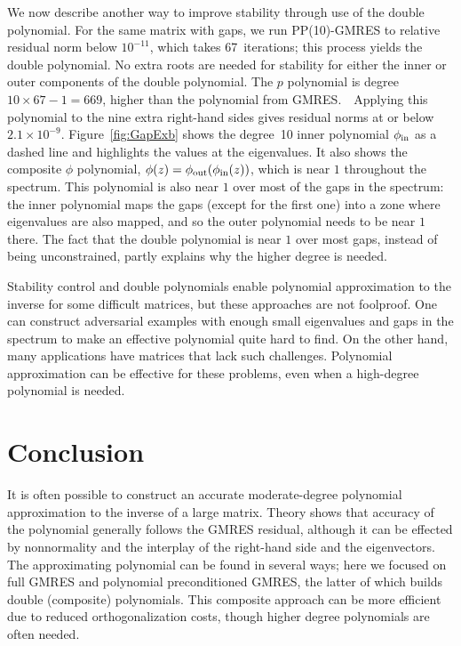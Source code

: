 \documentclass{siamart}
\begin{document}
We now describe another way to improve stability through use of the double polynomial.  For the same matrix with gaps, we run PP(10)-GMRES to relative residual norm below $10^{-11}$, which takes 67~iterations; this process yields the double polynomial.  No extra roots are needed for stability for either the inner or outer components of the double polynomial.  The $p$ polynomial is degree $10\times 67-1 = 669$, higher than the polynomial from GMRES.\ \   Applying this polynomial to the nine extra right-hand sides gives residual norms at or below $2.1\times 10^{-9}$.  Figure~\ref{fig:GapExb} shows the degree~10 inner polynomial $\phi_{\rm in}$ as a dashed line and highlights the values at the eigenvalues.  It also shows the composite $\phi$ polynomial, $\phi(z) = \phi_{\rm out}(\phi_{\rm in}(z))$, which is near $1$ throughout the spectrum.  This polynomial is also near $1$ over most of the gaps in the spectrum: the inner polynomial maps the gaps (except for the first one) into a zone where eigenvalues are also mapped, and so the outer polynomial needs to be near $1$ there.  The fact that the double polynomial is near $1$ over most gaps, instead of being unconstrained, partly explains why the higher degree is needed. 

Stability control and double polynomials enable polynomial approximation to the inverse for some difficult matrices, but these approaches are not foolproof.  One can construct adversarial examples with enough small eigenvalues and gaps in the spectrum to make an effective polynomial quite hard to find.  On the other hand, many applications have matrices that lack such challenges.  Polynomial approximation can be effective for these problems, even when a high-degree polynomial is needed.

\section{Conclusion}
It is often possible to construct an accurate moderate-degree polynomial approximation to the inverse of a large matrix.   Theory shows that accuracy of the polynomial generally follows the GMRES residual, although it can be effected by nonnormality and the interplay of the right-hand side and the eigenvectors.  The approximating polynomial can be found in several ways; here we focused on full GMRES and polynomial preconditioned GMRES, the latter of which builds double (composite) polynomials.  This composite approach can be more efficient due to reduced orthogonalization costs, though higher degree polynomials are often needed.
\end{document}
